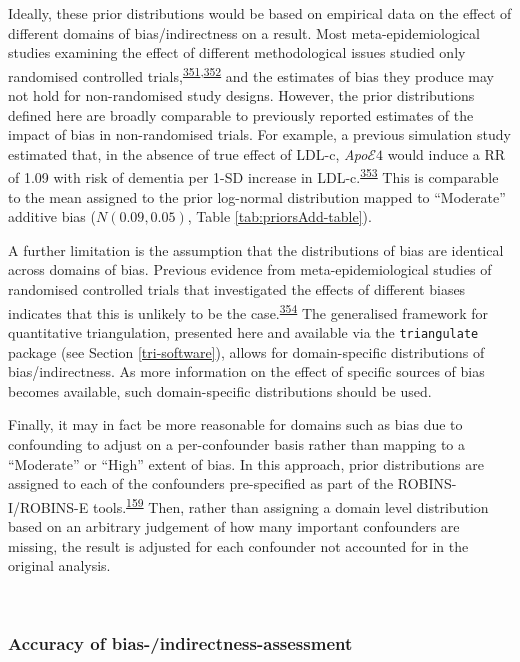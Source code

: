 \documentclass[a4paper, twoside]{templates/ociamthesis}
\begin{document}
Ideally, these prior distributions would be based on empirical data on the effect of different domains of bias/indirectness on a result. Most meta-epidemiological studies examining the effect of different methodological issues studied only randomised controlled trials,\textsuperscript{\protect\hyperlink{ref-amer2021}{351},\protect\hyperlink{ref-page2016}{352}} and the estimates of bias they produce may not hold for non-randomised study designs. However, the prior distributions defined here are broadly comparable to previously reported estimates of the impact of bias in non-randomised trials. For example, a previous simulation study estimated that, in the absence of true effect of LDL-c, \emph{Apo}\(\mathcal{E}4\) would induce a RR of 1.09 with risk of dementia per 1-SD increase in LDL-c.\textsuperscript{\protect\hyperlink{ref-iwagami2021}{353}} This is comparable to the mean assigned to the prior log-normal distribution mapped to ``Moderate'' additive bias (\(N(0.09,0.05)\), Table \ref{tab:priorsAdd-table}).

A further limitation is the assumption that the distributions of bias are identical across domains of bias. Previous evidence from meta-epidemiological studies of randomised controlled trials that investigated the effects of different biases indicates that this is unlikely to be the case.\textsuperscript{\protect\hyperlink{ref-savovic2018}{354}} The generalised framework for quantitative triangulation, presented here and available via the \texttt{triangulate} package (see Section \ref{tri-software}), allows for domain-specific distributions of bias/indirectness. As more information on the effect of specific sources of bias becomes available, such domain-specific distributions should be used.

Finally, it may in fact be more reasonable for domains such as bias due to confounding to adjust on a per-confounder basis rather than mapping to a ``Moderate'' or ``High'' extent of bias. In this approach, prior distributions are assigned to each of the confounders pre-specified as part of the ROBINS-I/ROBINS-E tools.\textsuperscript{\protect\hyperlink{ref-sterne2016}{159}} Then, rather than assigning a domain level distribution based on an arbitrary judgement of how many important confounders are missing, the result is adjusted for each confounder not accounted for in the original analysis.

~

\hypertarget{tri-accuracy}{%
\subsubsection{Accuracy of bias-/indirectness-assessment}\label{tri-accuracy}}
\end{document}
